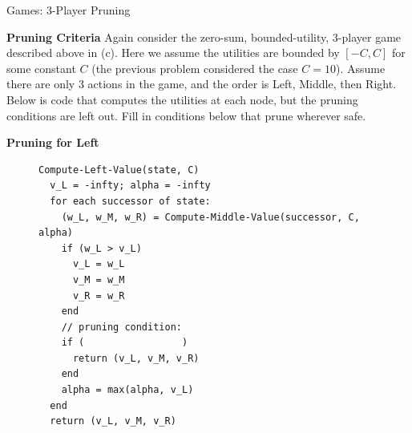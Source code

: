 \begin{problem}[18]{Games: 3-Player Pruning}
\begin{question}[6]{\bf Pruning Criteria}
Again consider the zero-sum, bounded-utility, 3-player game described
above in (c). Here we assume the utilities are bounded by $[-C, C]$ for some constant $C$ (the previous problem considered the case $C=10$). Assume there are only 3 actions in the game, and the order is Left, Middle, then Right. Below is code that computes the utilities at each
node, but the pruning conditions are left out.  Fill in conditions below that prune wherever safe.
\vspace{0.2in}
\begin{subquestion}[2]{\bf Pruning for Left}
\begin{figure}[H]
\begin{minipage}[b]{0.5\linewidth}
\vspace{0.2in}
\begin{verbatim}
Compute-Left-Value(state, C)
  v_L = -infty; alpha = -infty
  for each successor of state:
    (w_L, w_M, w_R) = Compute-Middle-Value(successor, C, alpha)
    if (w_L > v_L)
      v_L = w_L
      v_M = w_M
      v_R = w_R
    end
    // pruning condition:
    if (                 )
      return (v_L, v_M, v_R)
    end
    alpha = max(alpha, v_L)
  end
  return (v_L, v_M, v_R)
\end{verbatim}

\vspace{1in}
\end{minipage}
\end{figure}

\end{subquestion}


\end{question}
\end{problem}

